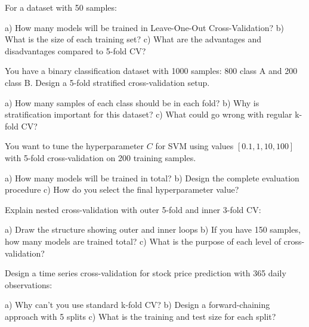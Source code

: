 \documentclass{article}
\newcounter{exercise}
\begin{document}
\begin{tcolorbox}[colback=gray!5!white,colframe=gray!75!black,title=Problem \stepcounter{exercise}: LOOCV Analysis]

For a dataset with 50 samples:

a) How many models will be trained in Leave-One-Out Cross-Validation?
b) What is the size of each training set?
c) What are the advantages and disadvantages compared to 5-fold CV?
\end{tcolorbox}

\begin{tcolorbox}[colback=gray!5!white,colframe=gray!75!black,title=Problem \stepcounter{exercise}: Stratified CV Design]

You have a binary classification dataset with 1000 samples: 800 class A and 200 class B. Design a 5-fold stratified cross-validation setup.

a) How many samples of each class should be in each fold?
b) Why is stratification important for this dataset?
c) What could go wrong with regular k-fold CV?
\end{tcolorbox}

\begin{tcolorbox}[colback=gray!5!white,colframe=gray!75!black,title=Problem \stepcounter{exercise}: Hyperparameter Tuning Setup]

You want to tune the hyperparameter $C$ for SVM using values $[0.1, 1, 10, 100]$ with 5-fold cross-validation on 200 training samples.

a) How many models will be trained in total?
b) Design the complete evaluation procedure
c) How do you select the final hyperparameter value?
\end{tcolorbox}

\begin{tcolorbox}[colback=gray!5!white,colframe=gray!75!black,title=Problem \stepcounter{exercise}: Nested CV Structure]

Explain nested cross-validation with outer 5-fold and inner 3-fold CV:

a) Draw the structure showing outer and inner loops
b) If you have 150 samples, how many models are trained total?
c) What is the purpose of each level of cross-validation?
\end{tcolorbox}

\begin{tcolorbox}[colback=gray!5!white,colframe=gray!75!black,title=Problem \stepcounter{exercise}: Time Series CV Design]

Design a time series cross-validation for stock price prediction with 365 daily observations:

a) Why can't you use standard k-fold CV?
b) Design a forward-chaining approach with 5 splits
c) What is the training and test size for each split?
\end{tcolorbox}
\end{document}
